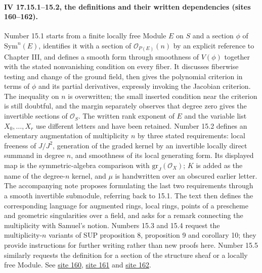 \documentclass[10pt,a4paper]{article}
\begin{document}
\paragraph{IV 17.15.1--15.2, the definitions and their written dependencies (sites 160--162).}
Number 15.1 starts from a finite locally free Module $E$ on $S$ and a section $\phi$ of $\mathrm{Sym}^n(E)$, identifies it with a section of $\mathcal O_{P(E)}(n)$ by an explicit reference to Chapter III, and defines a smooth form through smoothness of $V(\phi)$ together with the stated nonvanishing condition on every fiber. It discusses fiberwise testing and change of the ground field, then gives the polynomial criterion in terms of $\phi$ and its partial derivatives, expressly invoking the Jacobian criterion. The inequality on $n$ is overwritten; the small inserted condition near the criterion is still doubtful, and the margin separately observes that degree zero gives the invertible sections of $\mathcal O_S$. The written rank exponent of $E$ and the variable list $X_0,\ldots,X_r$ use different letters and have been retained. Number 15.2 defines an elementary augmentation of multiplicity $n$ by three stated requirements: local freeness of $J/J^2$, generation of the graded kernel by an invertible locally direct summand in degree $n$, and smoothness of its local generating form. Its displayed map is the symmetric-algebra comparison with $\mathrm{gr}_J(\mathcal O_X)$; $K$ is added as the name of the degree-$n$ kernel, and $\mu$ is handwritten over an obscured earlier letter. The accompanying note proposes formulating the last two requirements through a smooth invertible submodule, referring back to 15.1. The text then defines the corresponding language for augmented rings, local rings, points of a prescheme and geometric singularities over a field, and asks for a remark connecting the multiplicity with Samuel's notion. Numbers 15.3 and 15.4 request the multiplicity-$n$ variants of SUP proposition 8, proposition 9 and corollary 10; they provide instructions for further writing rather than new proofs here. Number 15.5 similarly requests the definition for a section of the structure sheaf or a locally free Module. See \href{https://grothendieck.umontpellier.fr/web/viewer.html?file=../25.pdf#page=161}{site 160}, \href{https://grothendieck.umontpellier.fr/web/viewer.html?file=../25.pdf#page=162}{site 161} and \href{https://grothendieck.umontpellier.fr/web/viewer.html?file=../25.pdf#page=163}{site 162}.
\end{document}
